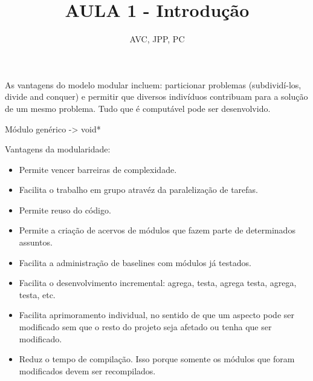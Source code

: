 \documentclass[
	12pt, %
]{fphw}
\title{AULA 1 - Introdução} %
\author{AVC, JPP, PC} %
\date{} %
\institute{Pontifícia Universidade Católica do Rio de Janeiro \\ Departamento de Informática} %
\begin{document}
\maketitle %

\begin{doublespace}
    As vantagens do modelo modular incluem: particionar problemas (subdividí-los, divide and conquer) e permitir que diversos indivíduos contribuam para a solução de um mesmo problema. Tudo que é computável pode ser desenvolvido.
    
    \noindent Módulo genérico -> void*
    
    \noindent Vantagens da modularidade:

    \begin{itemize}

        \item Permite vencer barreiras de complexidade.

        \item Facilita o trabalho em grupo atravéz da paralelização de tarefas.

        \item Permite reuso do código.

        \item Permite a criação de acervos de módulos que fazem parte de determinados assuntos.

        \item Facilita a administração de baselines com módulos já testados.

        \item Facilita o desenvolvimento incremental: agrega, testa, agrega testa, agrega, testa, etc.

        \item Facilita  aprimoramento individual, no sentido de que um aspecto pode ser modificado sem que o resto do projeto seja afetado ou tenha que ser modificado.

        \item Reduz o tempo de compilação. Isso porque somente os módulos que foram modificados devem ser recompilados.

    \end{itemize}


\end{doublespace}
\end{document}
